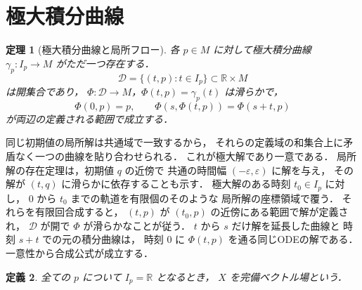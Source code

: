 \documentclass[a5paper,10pt,onecolumn]{jsarticle}
\makeatletter
\theoremstyle{mathnotetheorem}
\newtheorem{theorem}{定理}[section]
\newtheorem{definition}[theorem]{定義}
\renewcommand{\proofname}{証明}
\renewenvironment{proof}[1][\proofname]{%
  \par\pushQED{\qed}\normalfont\topsep4\p@\@plus2\p@\relax
  \trivlist\item[\hskip\labelsep\bfseries #1]\ignorespaces
}{\popQED\endtrivlist\@endpefalse}
\makeatother
\begin{document}
\section{極大積分曲線}
\begin{theorem}[極大積分曲線と局所フロー]\label{thm:flow}
各 $p\in M$ に対して極大積分曲線
$\gamma_p:I_p\to M$ がただ一つ存在する．
\[
 \mathcal D=\{(t,p):t\in I_p\}\subset\mathbb R\times M
\]
は開集合であり，
$\Phi:\mathcal D\to M$，$\Phi(t,p)=\gamma_p(t)$ は滑らかで，
\[
 \Phi(0,p)=p,\qquad
 \Phi(s,\Phi(t,p))=\Phi(s+t,p)
\]
が両辺の定義される範囲で成立する．
\end{theorem}
\begin{proof}
同じ初期値の局所解は共通域で一致するから，
それらの定義域の和集合上に矛盾なく一つの曲線を貼り合わせられる．
これが極大解であり一意である．
局所解の存在定理は，初期値 $q$ の近傍で
共通の時間幅 $(-\varepsilon,\varepsilon)$ に解を与え，
その解が $(t,q)$ に滑らかに依存することも示す．
極大解のある時刻 $t_0\in I_p$ に対し，
$0$ から $t_0$ までの軌道を有限個のそのような
局所解の座標領域で覆う．
それらを有限回合成すると，
$(t,p)$ が $(t_0,p)$ の近傍にある範囲で解が定義され，
$\mathcal D$ が開で $\Phi$ が滑らかなことが従う．
$t$ から $s$ だけ解を延長した曲線と
時刻 $s+t$ での元の積分曲線は，
時刻 $0$ に $\Phi(t,p)$ を通る同じODEの解である．
一意性から合成公式が成立する．
\end{proof}
\begin{definition}
全ての $p$ について $I_p=\mathbb R$ となるとき，
$X$ を完備ベクトル場という．
\end{definition}
\end{document}
